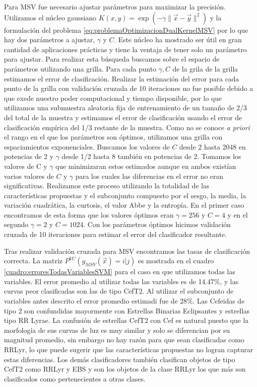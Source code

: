 \documentclass[letterpaper,12pt]{book}
\begin{document}
Para MSV fue necesario ajustar parámetros para maximizar la precisión. Utilizamos el núcleo gaussiano $K(x,y) = \exp(-\gamma\|\vec{x}-\vec{y}\|^2)$ y la formulación del problema \ref{eq:problemaOptimizacionDualKernelMSV} por lo que hay dos parámetros a ajustar, $\gamma$ y $C$. Este núcleo ha mostrado ser útil en gran cantidad de aplicaciones prácticas \cite{cristianini_introduction_2000} y tiene la ventaja de tener solo un parámetro para ajustar. Para realizar esta búsqueda buscamos sobre el espacio de parámetros utilizando una grilla. Para cada punto $\gamma, C$ de la grila de la grilla estimamos el error de clasificación. Realizar la estimación del error para cada punto de la grilla con validación cruzada de 10 iteraciones no fue posible debido a que exede nuestro poder computacional y tiempo disponible, por lo que utilizamos una submuestra aleatoria fija de entrenamiento de un tamaño de 2/3 del total de la muestra y estimamos el error de clasificación usando el error de clasificación empírica del 1/3 restante de la muestra. Como no se conoce \textit{a priori} el rango en el que los parámetros son óptimos, utilizamos una grilla con espaciamientos exponenciales. Buscamos los valores de $C$ desde 2 hasta 2048 en potencias de 2 y $\gamma$ desde 1/2 hasta 8 también en potencias de 2. Tomamos los valores de C y $\gamma$ que minimizaran estos estimados aunque en ambos existían varios valores de $C$ y $\gamma$ para los cuales las diferencias en el error no eran significativas. Realizamos este proceso utilizando la totalidad de las características propuestas y el subconjunto compuesto por el sesgo,  la media, la variación cuadrática, la curtosis, el valor Abbe y la entropía. En el primer caso encontramos de esta forma que los valores óptimos eran $\gamma = 256$ y $C = 4$ y  en el segundo $\gamma = 2$ y $C= 1024$. Con los parámetros óptimos hicimos validación cruzada de 10 iteraciones para estimar el error del clasificador resultante. 

Tras realizar validación cruzada para MSV encontramos las tasas de clasificación correcta. La matriz $P^{VC}(g_{MSV}(\vec{x})=i|j)$ es mostrada en el cuadro  \ref{cuadro:erroresTodasVariablesSVM} para el caso en que utilizamos todas las variables. El error promedio al utilizar todas las variables es de 14.47\%, y las curvas peor clasificadas son las de tipo CefT2. Al utilizar el subconjunto de variables antes descrito el error promedio estimadi fue de 28\%. Las Cefeidas de tipo 2 son confundidas mayormente con Estrellas Binarias Eclipsantes y estrellas tipo RR Lyrae. La confusión de estrellas CefT2 con Cef es natural puesto que la morfología de sus curvas de luz es muy similar y solo se diferencian por su magnitud promedio, sin embargo no hay razón para que sean clasificadas como RRLyr, lo que puede sugerir que las características propuestas no logran capturar estas diferencias. Los demás clasificadores también clasifican objetos de tipo CefT2 como RRLyr y EBS y son los objetos de la clase RRLyr los que más son clasificados como pertenecientes a otras clases. 
\end{document}
